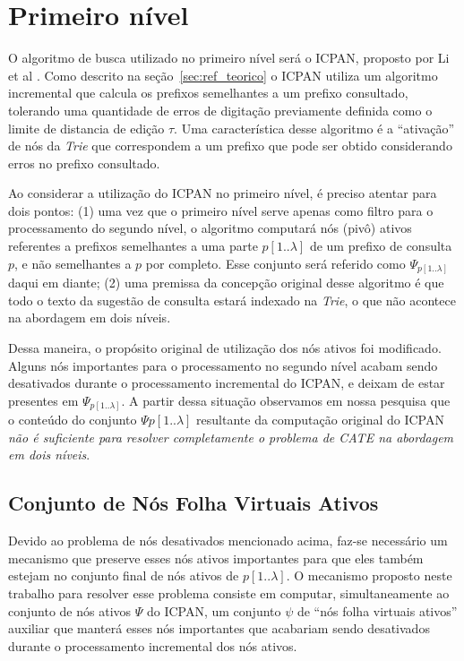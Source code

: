 \section{Primeiro nível}
\label{sec:first-level}

O algoritmo de busca utilizado no primeiro nível será o ICPAN, proposto por Li et al \citep{li2011efficient}. Como descrito na seção~\ref{sec:ref_teorico} o ICPAN utiliza um algoritmo incremental que calcula os prefixos semelhantes a um prefixo consultado, tolerando uma quantidade de erros de digitação previamente definida como o limite de distancia de edição $\tau$. Uma característica desse algoritmo é a ``ativação'' de nós da \textit{Trie} que correspondem a um prefixo que pode ser obtido considerando erros no prefixo consultado.

Ao considerar a utilização do ICPAN no primeiro nível, é preciso atentar para dois pontos: (1) uma vez que o primeiro nível serve apenas como filtro para o processamento do segundo nível, o algoritmo computará nós (pivô) ativos referentes a prefixos semelhantes a uma parte $p[1..\lambda]$ de um prefixo de consulta $p$, e não semelhantes a $p$ por completo. Esse conjunto será referido como $\Psi_{p[1..\lambda]}$ daqui em diante; (2) uma premissa da concepção original desse algoritmo é que todo o texto da sugestão de consulta estará indexado na \textit{Trie}, o que não acontece na abordagem em dois níveis.

Dessa maneira, o propósito original de utilização dos nós ativos foi modificado. Alguns nós importantes para o processamento no segundo nível acabam sendo desativados durante o processamento incremental do ICPAN, e deixam de estar presentes em $\Psi_{p[1..\lambda]}$. A partir dessa situação observamos em nossa pesquisa que o conteúdo do conjunto $\Psi{p[1..\lambda]}$ resultante da computação original do ICPAN \textit{não é suficiente para resolver completamente o problema de CATE na abordagem em dois níveis}. 

\subsection{Conjunto de Nós Folha Virtuais Ativos}
\label{sec:virtual_leaves_node-set}

Devido ao problema de nós desativados mencionado acima, faz-se necessário um mecanismo que preserve esses nós ativos importantes para que eles também estejam no conjunto final de nós ativos de $p[1..\lambda]$. O mecanismo proposto neste trabalho para resolver esse problema consiste em computar, simultaneamente ao conjunto de nós ativos $\Psi$ do ICPAN, um conjunto $\psi$ de ``nós folha virtuais ativos'' auxiliar que manterá esses nós importantes que acabariam sendo desativados durante o processamento incremental dos nós ativos. 

